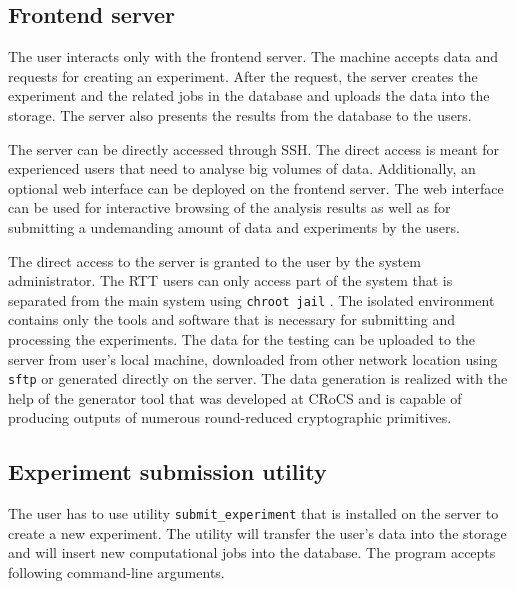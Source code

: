 \documentclass[
	digital,    %
	oneside,
	color,
	11pt,
	nocover,
	notable,
	nolof,
	nolot,
]{fithesis3}
\theoremstyle{definition}
\theoremstyle{remark}
\begin{document}
\subsection{Frontend server}
The user interacts only with the frontend server. The machine accepts data and requests for creating an experiment. After the request, the server creates the experiment and the related jobs in the database and uploads the data into the storage. The server also presents the results from the database to the users.

The server can be directly accessed through SSH. The direct access is meant for experienced users that need to analyse big volumes of data. Additionally, an optional web interface can be deployed on the frontend server. The web interface can be used for interactive browsing of the analysis results as well as for submitting a undemanding amount of data and experiments by the users.

The direct access to the server is granted to the user by the system administrator. The RTT users can only access part of the system that is separated from the main system using \texttt{chroot jail} \cite{chroot}. The isolated environment contains only the tools and software that is necessary for submitting and processing the experiments. The data for the testing can be uploaded to the server from user's local machine, downloaded from other network location using \texttt{sftp} or generated directly on the server. The data generation is realized with the help of the generator tool \cite{eacirc-streams} that was developed at CRoCS and is capable of producing outputs of numerous round-reduced cryptographic primitives.

\subsection*{Experiment submission utility}

The user has to use utility \texttt{submit\_experiment} that is installed on the server to create a new experiment. The utility will transfer the user's data into the storage and will insert new computational jobs into the database. The program accepts following command-line arguments.
\end{document}
